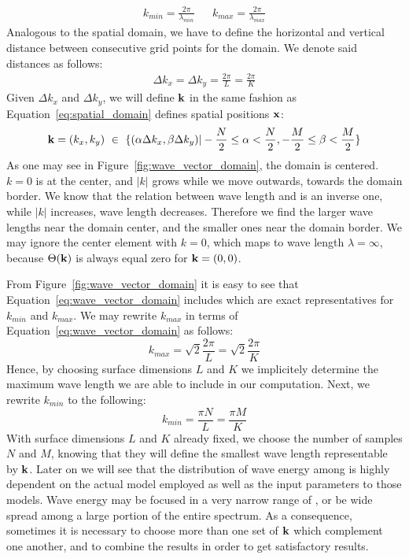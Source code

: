 \begin{align}
 k_{min} = \frac{2\pi}{\lambda_{min}} && k_{max} = \frac{2\pi}{\lambda_{max}}
\end{align}
%
Analogous to the spatial domain, we have to define the horizontal and vertical 
distance between consecutive grid points for the \wavevector domain. We denote 
said distances as follows:
\begin{align}
\label{eq:delta_kx_delta_ky}
 \Delta k_x = \Delta k_y = \frac{2\pi}{L} = \frac{2\pi}{K}
\end{align}
%
Given $\Delta k_x$ and $\Delta k_y$, we will define \wavevectors $\mathbf{k}$ in 
the same fashion as Equation~\ref{eq:spatial_domain} defines spatial positions 
$\mathbf{x}$:
\begin{equation}
\label{eq:wave_vector_domain}
 \mathbf{k} = (k_x,k_y)~\in~\{(\alpha\Delta k_x,\beta\Delta k_y)|
-\frac{N}{2}\leq\alpha<\frac{N}{2},-\frac{M}{2}\leq\beta<\frac{M}{2}\}
\end{equation}
%
As one may see in Figure~\ref{fig:wave_vector_domain}, the \wavevector domain 
is centered. \Wavenumber $k = 0$ is at the center, and $|k|$ grows while we 
move outwards, towards the domain border. We know that the relation between wave 
length and \wavenumber is an inverse one, while $|k|$ increases, wave length 
decreases. Therefore we find the larger wave lengths near the domain center, 
and the smaller ones near the domain border. We may ignore the center element 
with \wavenumber $k = 0$, which maps to wave length $\lambda = \infty$, because 
$\Theta(\mathbf{k})$ is always equal zero for \wavevector $\mathbf{k} = (0, 0)$.

From Figure~\ref{fig:wave_vector_domain} it is easy to see that  
Equation~\ref{eq:wave_vector_domain} includes \wavevectors which are exact 
representatives for \wavenumber $k_{min}$ and $k_{max}$. We may rewrite
\wavenumber $k_{max}$ in terms of Equation~\ref{eq:wave_vector_domain} as follows:
\begin{equation}
 k_{max} = \sqrt{2}\frac{2\pi}{L} = \sqrt{2}\frac{2\pi}{K}
\end{equation}
Hence, by choosing surface dimensions $L$ and $K$ we implicitely determine the 
maximum wave length we are able to include in our computation. Next, we rewrite 
$k_{min}$ to the following:
\begin{equation}
 k_{min} = \frac{\pi N}{L} = \frac{\pi M}{K}
\end{equation}
With surface dimensions $L$ and $K$ already fixed, we choose the number of 
samples $N$ and $M$, knowing that they will define the smallest wave length 
representable by \wavevectors $\mathbf{k}$. Later on we will see that the 
distribution of wave energy among \wavevectors is highly dependent on the 
actual model employed as well as the input parameters to those models. Wave 
energy may be focused in a very narrow range of \wavevectors, or be wide spread 
among a large portion of the entire \wavevector spectrum. As a consequence, 
sometimes it is necessary to choose more than one set of \wavevectors 
$\mathbf{k}$ which complement one another, and to combine the results in order 
to get satisfactory results.
%
